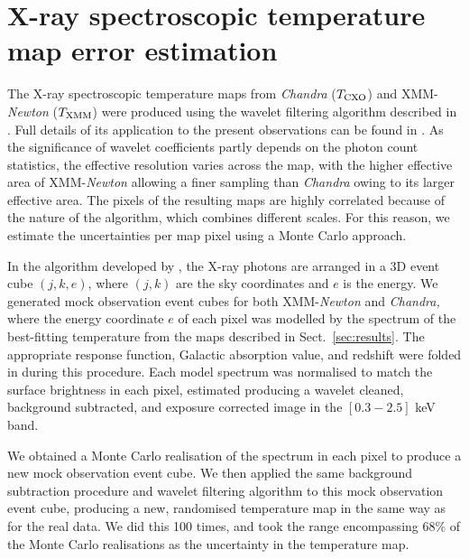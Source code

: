 \documentclass[twocolumn,traditabstract]{aa}
\def \TXC {T_{\rm CXO}}
\def \TXX {T_{\rm XMM}}
\begin{document}
\section{X-ray spectroscopic temperature map error estimation}\label{append:Txerror}
The X-ray spectroscopic temperature maps from \textit{Chandra} ($\TXC$) and XMM-\textit{Newton} ($\TXX$) were produced using the wavelet filtering algorithm described in \cite{Bourdin2008}. Full details of its application to the present observations can be found in \cite{Adam2016b}. As the significance of wavelet coefficients partly depends on the photon count statistics, the effective resolution varies across the map, with the higher effective area of XMM-\textit{Newton} allowing a finer sampling than \textit{Chandra} owing to its larger effective area. The pixels of the resulting maps are highly correlated because of the nature of the algorithm, which combines different scales. For this reason, we estimate the uncertainties per map pixel using a Monte Carlo approach.

In the algorithm developed by \citet{Bourdin2008}, the X-ray photons are arranged in a 3D event cube $(j,k,e)$, where $(j,k)$ are the sky coordinates and $e$ is the energy. We generated mock observation event cubes for both XMM-{\it Newton} and {\it Chandra,} where the energy coordinate $e$ of each pixel was modelled by the spectrum of the best-fitting temperature from the maps described in Sect.~\ref{sec:results}. The appropriate response function, Galactic absorption value, and redshift were folded in during this procedure. Each model spectrum was normalised to match the surface brightness in each pixel, estimated producing a wavelet cleaned, background subtracted, and exposure corrected image in the $[0.3-2.5]$ keV band.

We obtained a Monte Carlo realisation of the spectrum in each pixel to produce a new mock observation event cube. We then applied the same background subtraction procedure and wavelet filtering algorithm to this mock observation event cube, producing a new, randomised temperature map in the same way as for the real data. We did this 100 times, and took the range encompassing 68\% of the Monte Carlo realisations as the uncertainty in the temperature map.

\end{document}
